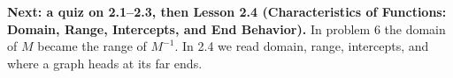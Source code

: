 \documentclass[10pt]{article}
\begin{document}
\boxguard[5]
\begin{spiralbox}
\small
\textbf{Next: a quiz on 2.1--2.3, then Lesson 2.4 (Characteristics of Functions: Domain,
Range, Intercepts, and End Behavior).} In problem 6 the domain of $M$ became the range of
$M^{-1}$. In 2.4 we read domain, range, intercepts, and where a graph heads at its far ends.
\end{spiralbox}
\end{document}
